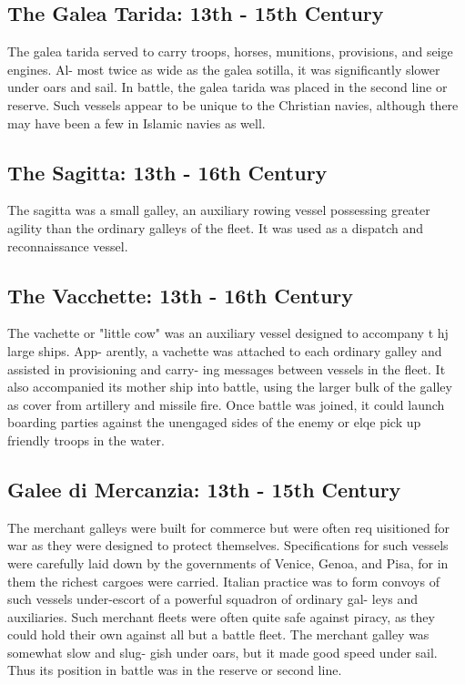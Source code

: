 \documentclass{article}
\begin{document}
\begin{multicols}{2}
\subsection{The Galea Tarida:  13th - 15th Century}

The galea tarida served to carry troops, horses, munitions,
provisions, and seige engines.  Al- most twice as wide as the galea
sotilla, it was significantly slower under oars and sail.  In battle,
the galea tarida was placed in the second line or reserve.  Such
vessels appear to be unique to the Christian navies, although there
may have been a few in Islamic navies as well.

\subsection{The Sagitta:  13th - 16th Century}

The sagitta was a small galley, an auxiliary rowing vessel possessing
greater agility than the ordinary galleys of the fleet.  It was used
as a dispatch and reconnaissance vessel.

\subsection{The Vacchette:  13th - 16th Century}

The vachette or "little cow" was an auxiliary vessel designed to
accompany t hj large ships.  App- arently, a vachette was attached to
each ordinary galley and assisted in provisioning and carry- ing
messages between vessels in the fleet.  It also accompanied its mother
ship into battle, using the larger bulk of the galley as cover from
artillery and missile fire.  Once battle was joined, it could launch
boarding parties against the unengaged sides of the enemy or elqe pick
up friendly troops in the water.

\subsection{Galee di Mercanzia:  13th - 15th Century}

The merchant galleys were built for commerce but were often req
uisitioned for war as they were designed to protect
themselves. Specifications for such vessels were carefully laid down
by the governments of Venice, Genoa, and Pisa, for in them the richest
cargoes were carried.  Italian practice was to form convoys of such
vessels under-escort of a powerful squadron of ordinary gal- leys and
auxiliaries. Such merchant fleets were often quite safe against
piracy, as they could hold their own against all but a battle
fleet. The merchant galley was somewhat slow and slug- gish under
oars, but it made good speed under sail.  Thus its position in battle
was in the reserve or second line.


\end{multicols}
\end{document}
